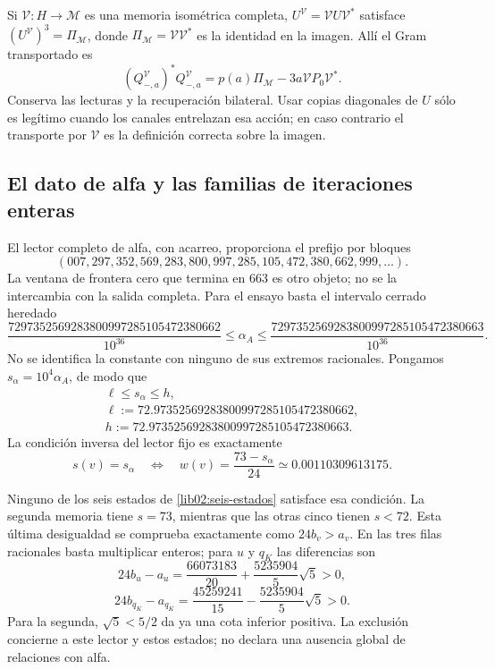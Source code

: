 Si \(\mathcal V:H\to\mathcal M\) es una memoria isométrica
completa, \(U^{\mathcal V}=\mathcal VU\mathcal V^*\) satisface
\((U^{\mathcal V})^3=\Pi_{\mathcal M}\), donde
\(\Pi_{\mathcal M}=\mathcal V\mathcal V^*\) es la identidad en
la imagen. Allí el Gram transportado es
\[
 (Q_{-,a}^{\mathcal V})^*Q_{-,a}^{\mathcal V}
 =p(a)\Pi_{\mathcal M}-3a\mathcal VP_0\mathcal V^*.
\]
Conserva las lecturas y la recuperación bilateral. Usar copias diagonales
de \(U\) sólo es legítimo cuando los canales entrelazan esa acción;
en caso contrario el transporte por \(\mathcal V\) es la definición
correcta sobre la imagen.

\subsection{El dato de alfa y las familias de iteraciones enteras}
\label{lib02:ensayo-inverso}

El lector completo de alfa, con acarreo, proporciona el prefijo por
bloques
\[
 (007,297,352,569,283,800,997,285,105,472,380,662,999,\ldots).
\]
La ventana de frontera cero que termina en 663 es otro objeto; no se la
intercambia con la salida completa. Para el ensayo basta el intervalo
cerrado heredado
\begin{equation}
 \frac{7297352569283800997285105472380662}{10^{36}}
 \leq\alpha_A\leq
 \frac{7297352569283800997285105472380663}{10^{36}}.
 \label{lib02:intervalo-alpha}
\end{equation}
No se identifica la constante con ninguno de sus extremos racionales.
Pongamos \(s_\alpha=10^4\alpha_A\), de modo que
\begin{equation}
 \begin{gathered}
 \ell\leq s_\alpha\leq h,\\
 \ell:=72.97352569283800997285105472380662,\\
 h:=72.97352569283800997285105472380663.
 \end{gathered}
 \label{lib02:intervalo-s}
\end{equation}
La condición inversa del lector fijo es exactamente
\begin{equation}
 s(v)=s_\alpha
 \quad\Longleftrightarrow\quad
 w(v)=\frac{73-s_\alpha}{24}
 \simeq0.00110309613175.
 \label{lib02:criterio-alpha}
\end{equation}

Ninguno de los seis estados de \cref{lib02:seis-estados} satisface esa
condición. La segunda memoria tiene \(s=73\), mientras que las otras
cinco tienen \(s<72\). Esta última desigualdad se comprueba exactamente
como \(24b_v>a_v\). En las tres filas racionales basta multiplicar
enteros; para \(u\) y \(q_K\) las diferencias son
\[
 24b_u-a_u=\frac{66073183}{20}+\frac{5235904}{5}\sqrt5>0,
\]
\[
 24b_{q_K}-a_{q_K}
 =\frac{45259241}{15}-\frac{5235904}{5}\sqrt5>0.
\]
Para la segunda, \(\sqrt5<5/2\) da ya una cota inferior positiva.
La exclusión concierne a este lector y estos estados; no declara una
ausencia global de relaciones con alfa.

